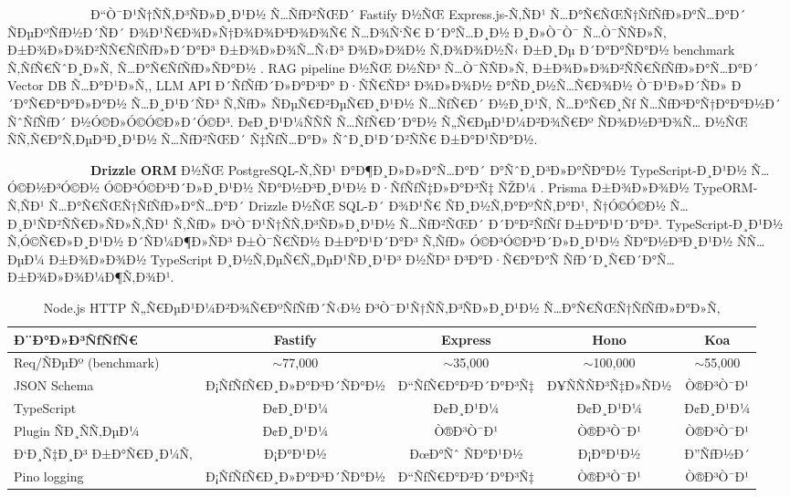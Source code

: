 \documentclass[12pt,A4]{report}
\begin{document}
\ \ \ \ \ \ \ \ \  \ \ \ \ Ð“Ò¯Ð¹Ñ†ÑÑ‚Ð³ÑÐ»Ð¸Ð¹Ð½ Ñ…ÑƒÐ²ÑŒÐ´ Fastify Ð½ÑŒ Express.js-Ñ‚ÑÐ¹
Ñ…Ð°Ñ€ÑŒÑ†ÑƒÑƒÐ»Ð°Ñ…Ð°Ð´ ÑÐµÐºÑƒÐ½Ð´ÑÐ´ Ð¾Ð¹Ñ€Ð¾Ð»Ñ†Ð¾Ð¾Ð³Ð¾Ð¾Ñ€ Ñ…Ð¾Ñ‘Ñ€ Ð´Ð°Ñ…Ð¸Ð½ Ð¸Ð»Ò¯Ò¯ Ñ…Ò¯ÑÑÐ»Ñ‚
Ð±Ð¾Ð»Ð¾Ð²ÑÑ€ÑƒÑƒÐ»Ð´Ð°Ð³ Ð±Ð¾Ð»Ð¾Ñ…Ñ‹Ð³ Ð¾Ð»Ð¾Ð½ Ñ‚Ð¾Ð¾Ð½Ñ‹ Ð±Ð¸Ðµ Ð´Ð°Ð°ÑÐ°Ð½ benchmark Ñ‚ÑƒÑ€ÑˆÐ¸Ð»Ñ‚
Ñ…Ð°Ñ€ÑƒÑƒÐ»ÑÐ°Ð½ \cite{fastify2024}. RAG pipeline Ð½ÑŒ Ð½ÑÐ³ Ñ…Ò¯ÑÑÐ»Ñ‚
Ð±Ð¾Ð»Ð¾Ð²ÑÑ€ÑƒÑƒÐ»Ð°Ñ…Ð°Ð´ Vector DB Ñ…Ð°Ð¹Ð»Ñ‚, LLM API Ð´ÑƒÑƒÐ´Ð»Ð°Ð³Ð° Ð·ÑÑ€ÑÐ³ Ð¾Ð»Ð¾Ð½
Ð°ÑÐ¸Ð½Ñ…Ñ€Ð¾Ð½ Ò¯Ð¹Ð»Ð´ÑÐ» Ð´Ð°Ñ€Ð°Ð°Ð»Ð°Ð½ Ñ…Ð¸Ð¹Ð´ÑÐ³ Ñ‚ÑƒÐ» ÑÐµÑ€Ð²ÐµÑ€Ð¸Ð¹Ð½ Ñ…ÑƒÑ€Ð´ Ð½Ð¸Ð¹Ñ‚
Ñ…Ð°Ñ€Ð¸Ñƒ Ñ…ÑƒÐ³Ð°Ñ†Ð°Ð°Ð½Ð´ ÑˆÑƒÑƒÐ´ Ð½Ó©Ð»Ó©Ó©Ð»Ð´Ó©Ð³. Ð¢Ð¸Ð¹Ð¼ÑÑÑ Ñ…ÑƒÑ€Ð´Ð°Ð½ Ñ„Ñ€ÐµÐ¹Ð¼Ð²Ð¾Ñ€Ðº
ÑÐ¾Ð½Ð³Ð¾Ñ… Ð½ÑŒ ÑÑ‚Ñ€Ð°Ñ‚ÐµÐ³Ð¸Ð¹Ð½ Ñ…ÑƒÐ²ÑŒÐ´ Ñ‡ÑƒÑ…Ð°Ð» ÑˆÐ¸Ð¹Ð´Ð²ÑÑ€ Ð±Ð°Ð¹ÑÐ°Ð½.

\ \ \ \ \ \ \ \ \  \ \ \ \ \textbf{Drizzle ORM} Ð½ÑŒ PostgreSQL-Ñ‚ÑÐ¹
Ð°Ð¶Ð¸Ð»Ð»Ð°Ñ…Ð°Ð´ Ð°ÑˆÐ¸Ð³Ð»Ð°ÑÐ°Ð½ TypeScript-Ð¸Ð¹Ð½ Ñ…Ó©Ð½Ð³Ó©Ð½ Ó©Ð³Ó©Ð³Ð´Ð»Ð¸Ð¹Ð½ ÑÐ°Ð½Ð³Ð¸Ð¹Ð½
Ð·ÑƒÑƒÑ‡Ð»Ð°Ð³Ñ‡ ÑŽÐ¼ \cite{drizzle2024}. Prisma Ð±Ð¾Ð»Ð¾Ð½ TypeORM-Ñ‚ÑÐ¹
Ñ…Ð°Ñ€ÑŒÑ†ÑƒÑƒÐ»Ð°Ñ…Ð°Ð´ Drizzle Ð½ÑŒ SQL-Ð´ Ð¾Ð¹Ñ€ ÑÐ¸Ð½Ñ‚Ð°ÐºÑÑ‚Ð°Ð¹, Ñ†Ó©Ó©Ð½ Ñ…Ð¸Ð¹ÑÐ²ÑÑ€Ð»ÑÐ»Ñ‚ÑÐ¹
Ñ‚ÑƒÐ» Ð³Ò¯Ð¹Ñ†ÑÑ‚Ð³ÑÐ»Ð¸Ð¹Ð½ Ñ…ÑƒÐ²ÑŒÐ´ Ð´Ð°Ð²ÑƒÑƒ Ð±Ð°Ð¹Ð´Ð°Ð³. TypeScript-Ð¸Ð¹Ð½ Ñ‚Ó©Ñ€Ð»Ð¸Ð¹Ð½
Ð´ÑÐ¼Ð¶Ð»ÑÐ³ Ð±Ò¯Ñ€ÑÐ½ Ð±Ð°Ð¹Ð´Ð°Ð³ Ñ‚ÑƒÐ» Ó©Ð³Ó©Ð³Ð´Ð»Ð¸Ð¹Ð½ ÑÐ°Ð½Ð³Ð¸Ð¹Ð½ ÑÑ…ÐµÐ¼ Ð±Ð¾Ð»Ð¾Ð½
TypeScript Ð¸Ð½Ñ‚ÐµÑ€Ñ„ÐµÐ¹ÑÐ¸Ð¹Ð³ Ð½ÑÐ³ Ð³Ð°Ð·Ñ€Ð°Ð°Ñ ÑƒÐ´Ð¸Ñ€Ð´Ð°Ñ… Ð±Ð¾Ð»Ð¾Ð¼Ð¶Ñ‚Ð¾Ð¹.

\begin{table}[h]
\centering
\caption{Node.js HTTP Ñ„Ñ€ÐµÐ¹Ð¼Ð²Ð¾Ñ€ÐºÑƒÑƒÐ´Ñ‹Ð½ Ð³Ò¯Ð¹Ñ†ÑÑ‚Ð³ÑÐ»Ð¸Ð¹Ð½ Ñ…Ð°Ñ€ÑŒÑ†ÑƒÑƒÐ»Ð°Ð»Ñ‚}
\begin{tabular}{|l|c|c|c|c|}
\hline
\textbf{Ð¨Ð°Ð»Ð³ÑƒÑƒÑ€} & \textbf{Fastify} & \textbf{Express} &
\textbf{Hono} & \textbf{Koa} \\
\hline
Req/ÑÐµÐº (benchmark) & $\sim$77,000 & $\sim$35,000 &
$\sim$100,000 & $\sim$55,000 \\
JSON Schema         & Ð¡ÑƒÑƒÑ€Ð¸Ð»Ð°Ð³Ð´ÑÐ°Ð½ & Ð“ÑƒÑ€Ð°Ð²Ð´Ð°Ð³Ñ‡ & Ð¥ÑÑÑÐ³Ñ‡Ð»ÑÐ½ & Ò®Ð³Ò¯Ð¹ \\
TypeScript          & Ð¢Ð¸Ð¹Ð¼   & Ð¢Ð¸Ð¹Ð¼   & Ð¢Ð¸Ð¹Ð¼   & Ð¢Ð¸Ð¹Ð¼ \\
Plugin ÑÐ¸ÑÑ‚ÐµÐ¼       & Ð¢Ð¸Ð¹Ð¼   & Ò®Ð³Ò¯Ð¹   & Ò®Ð³Ò¯Ð¹   & Ò®Ð³Ò¯Ð¹ \\
Ð‘Ð¸Ñ‡Ð¸Ð³ Ð±Ð°Ñ€Ð¸Ð¼Ñ‚        & Ð¡Ð°Ð¹Ð½   & ÐœÐ°Ñˆ ÑÐ°Ð¹Ð½ & Ð¡Ð°Ð¹Ð½  & Ð”ÑƒÐ½Ð´ \\
Pino logging        & Ð¡ÑƒÑƒÑ€Ð¸Ð»Ð°Ð³Ð´ÑÐ°Ð½ & Ð“ÑƒÑ€Ð°Ð²Ð´Ð°Ð³Ñ‡ & Ò®Ð³Ò¯Ð¹ & Ò®Ð³Ò¯Ð¹ \\
\hline
\end{tabular}
\label{tab:backend_comparison}
\end{table}
\end{document}

